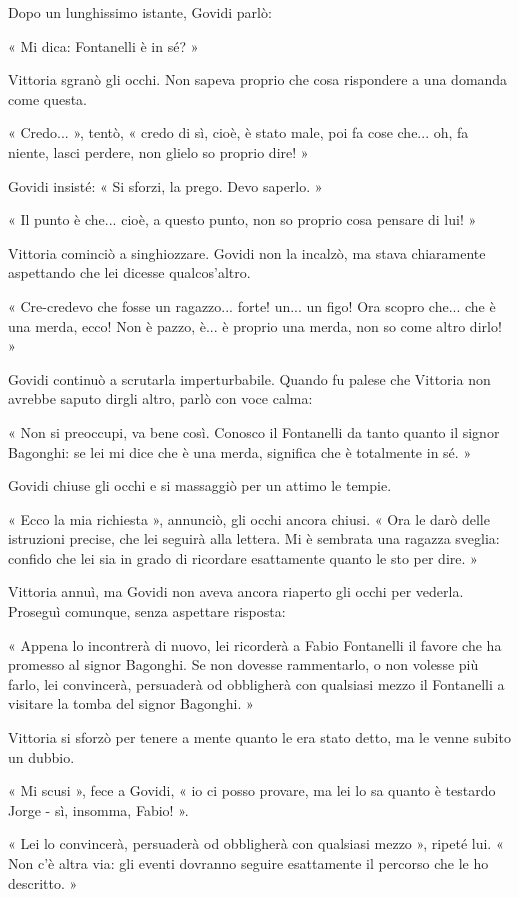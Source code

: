 Dopo un lunghissimo istante, Govidi parlò:

« Mi dica: Fontanelli è in sé? »

Vittoria sgranò gli occhi. Non sapeva proprio che cosa rispondere a una domanda come questa.

« Credo... », tentò, « credo di sì, cioè, è stato male, poi fa cose che... oh, fa niente, lasci perdere, non glielo so proprio dire! »

Govidi insisté: « Si sforzi, la prego. Devo saperlo. »

« Il punto è che... cioè, a questo punto, non so proprio cosa pensare di lui! »

Vittoria cominciò a singhiozzare. Govidi non la incalzò, ma stava chiaramente aspettando che lei dicesse qualcos'altro.

« Cre-credevo che fosse un ragazzo... forte! un... un figo! Ora scopro che... che è una merda, ecco! Non è pazzo, è... è proprio una merda, non so come altro dirlo! »

Govidi continuò a scrutarla imperturbabile. Quando fu palese che Vittoria non avrebbe saputo dirgli altro, parlò con voce calma:

« Non si preoccupi, va bene così. Conosco il Fontanelli da tanto quanto il signor Bagonghi: se lei mi dice che è una merda, significa che è totalmente in sé. »

Govidi chiuse gli occhi e si massaggiò per un attimo le tempie.

« Ecco la mia richiesta », annunciò, gli occhi ancora chiusi. « Ora le darò delle istruzioni precise, che lei seguirà alla lettera. Mi è sembrata una ragazza sveglia: confido che lei sia in grado di ricordare esattamente quanto le sto per dire. »

Vittoria annuì, ma Govidi non aveva ancora riaperto gli occhi per vederla. Proseguì comunque, senza aspettare risposta:

« Appena lo incontrerà di nuovo, lei ricorderà a Fabio Fontanelli il favore che ha promesso al signor Bagonghi. Se non dovesse rammentarlo, o non volesse più farlo, lei convincerà, persuaderà od obbligherà con qualsiasi mezzo il Fontanelli a visitare la tomba del signor Bagonghi. »

Vittoria si sforzò per tenere a mente quanto le era stato detto, ma le venne subito un dubbio.

« Mi scusi », fece a Govidi, « io ci posso provare, ma lei lo sa quanto è testardo Jorge - sì, insomma, Fabio! ».

« Lei lo convincerà, persuaderà od obbligherà con qualsiasi mezzo », ripeté lui. « Non c'è altra via: gli eventi dovranno seguire esattamente il percorso che le ho descritto. »

